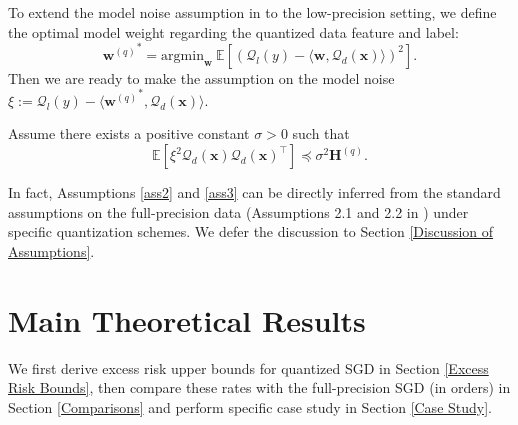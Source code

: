 \documentclass[11pt, letterpaper]{article}
\begin{document}
To extend the model noise assumption in \citet{zou2023benign} to the low-precision setting, we define the optimal model weight regarding the quantized data feature and label: 
\begin{equation*}
    {\mathbf{w}^{(q)}}^* = \mathrm{argmin}_\mathbf{w} \ \mathbb{E}\left[(\mathcal{Q}_l(y)-\langle \mathbf{w},\mathcal{Q}_d(\mathbf{x})\rangle)^2\right].
\end{equation*}
Then we are ready to make the assumption on the model noise $\xi:=\mathcal{Q}_l(y)-\langle{\mathbf{w}^{(q)}}^*,\mathcal{Q}_d(\mathbf{x})\rangle$.
\begin{assumption}
    \label{ass3}
    Assume there exists a positive constant $\sigma>0$ such that
    \begin{equation*}
        \mathbb{E}\left[\xi^2\mathcal{Q}_d(\mathbf{x})\mathcal{Q}_d(\mathbf{x})^\top\right]\preceq\sigma^{2}\mathbf{H}^{(q)}.
    \end{equation*}
\end{assumption}
In fact, Assumptions \ref{ass2} and \ref{ass3} can be directly inferred from the standard assumptions on the full-precision data (Assumptions 2.1 and 2.2 in \citet{zou2023benign}) under specific quantization schemes. We defer the discussion to Section \ref{Discussion of Assumptions}.


\section{Main Theoretical Results}
We first derive excess risk upper bounds for quantized SGD in Section \ref{Excess Risk Bounds}, then compare these rates with the full-precision SGD (in orders) in Section \ref{Comparisons} and perform specific case study in Section \ref{Case Study}. 
\end{document}
